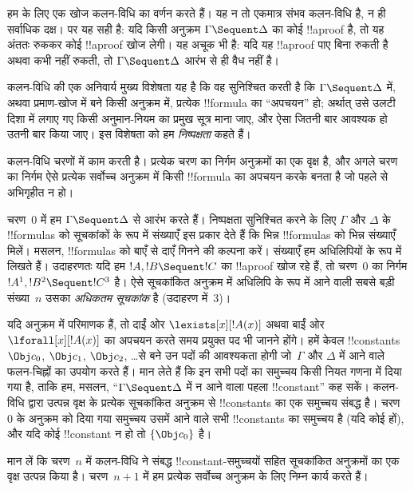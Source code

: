 \documentclass[../../../include/open-logic-section]{subfiles}
\begin{document}


हम  के लिए एक खोज कलन-विधि का वर्णन करते हैं। यह न तो एकमात्र संभव
कलन-विधि है, न ही सर्वाधिक दक्ष। पर यह सही है: यदि किसी अनुक्रम $\Gamma
\Sequent \Delta$ का कोई !!a{proof} है, तो यह अंततः रुककर कोई !!a{proof} खोज
लेगी। यह अचूक भी है: यदि यह !!a{proof} पाए बिना रुकती है अथवा कभी नहीं रुकती,
तो $\Gamma \Sequent \Delta$ आरंभ से ही वैध नहीं है।

कलन-विधि की एक अनिवार्य मुख्य विशेषता यह है कि वह सुनिश्चित करती है कि
$\Gamma \Sequent \Delta$ में, अथवा प्रमाण-खोज में बने किसी अनुक्रम में, प्रत्येक
!!{formula} का ``अपचयन'' हो; अर्थात् उसे उलटी दिशा में लगाए गए किसी अनुमान-नियम
का प्रमुख सूत्र माना जाए, और ऐसा जितनी बार आवश्यक हो उतनी बार किया जाए। इस
विशेषता को हम \emph{निष्पक्षता} कहते हैं।

कलन-विधि चरणों में काम करती है। प्रत्येक चरण का निर्गम अनुक्रमों का एक वृक्ष
है, और अगले चरण का निर्गम ऐसे प्रत्येक सर्वोच्च अनुक्रम में किसी !!{formula}
का अपचयन करके बनता है जो पहले से अभिगृहीत न हो।

चरण~$0$ में हम $\Gamma \Sequent \Delta$ से आरंभ करते हैं। निष्पक्षता
सुनिश्चित करने के लिए $\Gamma$ और $\Delta$ के !!{formula}s को सूचकांकों के रूप
में संख्याएँ इस प्रकार देते हैं कि भिन्न !!{formula}s को भिन्न संख्याएँ मिलें।
मसलन, !!{formula}s को बाएँ से दाएँ गिनने की कल्पना करें। संख्याएँ हम
अधिलिपियों के रूप में लिखते हैं। उदाहरणतः यदि हम $!A, !B \Sequent !C$ का
!!a{proof} खोज रहे हैं, तो चरण~$0$ का निर्गम $!A^1, !B^2 \Sequent !C^3$ है।
ऐसे सूचकांकित अनुक्रम में अधिलिपि के रूप में आने वाली सबसे बड़ी संख्या~$n$
उसका \emph{अधिकतम सूचकांक} है (उदाहरण में~$3$)।

यदि अनुक्रम में परिमाणक हैं, तो दाईं ओर $\lexists[x][!A(x)]$ अथवा बाईं ओर
$\lforall[x][!A(x)]$ का अपचयन करते समय प्रयुक्त पद भी जानने होंगे। हमें केवल
!!{constant}s $\Obj c_0$, $\Obj c_1$, $\Obj c_2$, \dots से बने उन पदों की
आवश्यकता होगी जो~$\Gamma$ और $\Delta$ में आने वाले फलन-चिह्नों का उपयोग करते
हैं। मान लेते हैं कि इन सभी पदों का समुच्चय किसी नियत गणना में दिया गया है,
ताकि हम, मसलन, ``$\Gamma \Sequent \Delta$ में न आने वाला पहला !!{constant}''
कह सकें। कलन-विधि द्वारा उत्पन्न वृक्ष के प्रत्येक सूचकांकित अनुक्रम से
!!{constant}s का एक समुच्चय संबद्ध है। चरण~$0$ के अनुक्रम को दिया गया समुच्चय
उसमें आने वाले सभी !!{constant}s का समुच्चय है (यदि कोई हों), और यदि कोई
!!{constant} न हो तो $\{\Obj c_0\}$ है।

मान लें कि चरण~$n$ में कलन-विधि ने संबद्ध !!{constant}-समुच्चयों सहित
सूचकांकित अनुक्रमों का एक वृक्ष उत्पन्न किया है। चरण~$n+1$ में हम प्रत्येक
सर्वोच्च अनुक्रम के लिए निम्न कार्य करते हैं।
\end{document}
